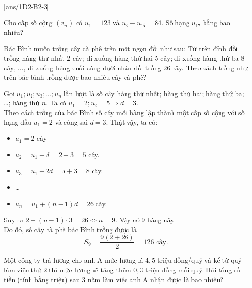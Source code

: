
 \\
[ans/1D2-B2-3]

\begin{ex}%
	Cho cấp số cộng $\left(u_n\right)$ có $u_1=123$ và $u_3-u_{15}=84$. Số hạng $u_{17}$ bằng bao nhiêu?\\
\end{ex}

\begin{ex}%
	Bác Bình muốn trồng cây cà phê trên một ngọn đồi như sau: Từ trên đỉnh đồi trồng hàng thứ nhất $2$ cây; đi xuống hàng thứ hai $5$ cây; đi xuống hàng thứ ba $8$ cây; $\ldots$; đi xuống hàng cuối cùng dưới chân đồi trồng $26$ cây. Theo cách trồng như trên bác bình trồng được bao nhiêu cây cà phê?\\
	\loigiai
	{
		Gọi $u_1;u_2;u_3; \ldots; u_n$ lần lượt là số cây hàng thứ nhất; hàng thứ hai; hàng thứ ba; \ldots; hàng thứ $n$.
		Ta có $u_1=2; u_2=5 \Rightarrow d=3$.\\
		Theo cách trồng của bác Bình số cây mỗi hàng lập thành một cấp số cộng với số hạng đầu $u_1=2$ và công sai $d=3$. Thật vậy, ta có:
		\begin{itemize}
			\item[•] $u_1= 2$ cây.
			\item[•] $u_2=u_1+d = 2+3=5$ cây.
			\item[•] $u_3=u_1+2d=5+3=8$ cây.
			\item[•] \ldots
			\item[•] $u_n = u_1+(n-1)d = 26$ cây.
		\end{itemize}
		Suy ra $2+(n-1)\cdot 3 =26 \Leftrightarrow n = 9$. Vậy có $9$ hàng cây.\\
		Do đó, số cây cà phê bác Bình trồng được là
		\[S_9 =\dfrac{9(2+26)}{2}=126 \text{ cây.} \]
	}
\end{ex}

\begin{ex}%
	Một công ty trả lương cho anh A mức lương là $ 4{,}5 $ triệu đồng/quý và kể từ quý làm việc thứ 2 thì mức lương sẽ tăng thêm $ 0{,}3 $ triệu đồng mỗi quý. Hỏi tổng số tiền  (tính bằng triệu)  sau $ 3 $ năm làm việc anh A nhận được là bao nhiêu? \\
\end{ex}


